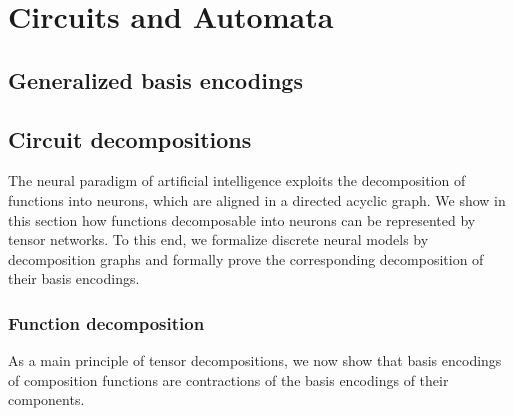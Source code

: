 
\chapter{Circuits and Automata}




\section{Generalized basis encodings}


\section{Circuit decompositions}\label{sec:neurPar}

The neural paradigm of artificial intelligence exploits the decomposition of functions into neurons, which are aligned in a directed acyclic graph.
We show in this section how functions decomposable into neurons can be represented by tensor networks.
To this end, we formalize discrete neural models by decomposition graphs and formally prove the corresponding decomposition of their basis encodings.

\subsection{Function decomposition}

As a main principle of tensor decompositions, we now show that basis encodings of composition functions are contractions of the basis encodings of their components.

